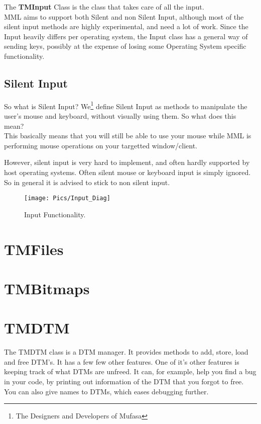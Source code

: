 \documentclass[a4paper]{report}
\begin{document}
The \textbf{TMInput} Class is the class that takes care of all the input. \\
MML aims to support both Silent and non Silent Input, although most of the
silent input methods are highly experimental, and need a lot of work.
Since the Input heavily differs per operating system, 
the Input class has a general way of sending keys, possibly at the expense
of losing some Operating System specific functionality.

\subsection{Silent Input}

So what is Silent Input?
We\footnote{The Designers and Developers of Mufasa} define Silent Input as
methods to manipulate the user's mouse and keyboard, without visually using
them. So what does this mean? \\

This basically means that you will still be able to use your mouse while
MML is performing mouse operations on your targetted window/client.

However, silent input is very hard to implement, and often hardly supported
by host operating systems. Often silent mouse or keyboard input is simply 
ignored. So in general it is advised to stick to non silent input.


\begin{figure}[ht]
	\texttt{[image: Pics/Input\_Diag]}
	\caption{Input Functionality.}
\end{figure}

\section{TMFiles}

\section{TMBitmaps}

\section{TMDTM}

The TMDTM class is a DTM manager. It provides methods to add, store, load
and free DTM's. It has a few few other features. One of it's other features
is keeping track of what DTMs are unfreed. It can, for example, help you find
a bug in your code, by printing out information of the DTM that you forgot to
free. You can also give names to DTMs, which eases debugging further.
\end{document}
